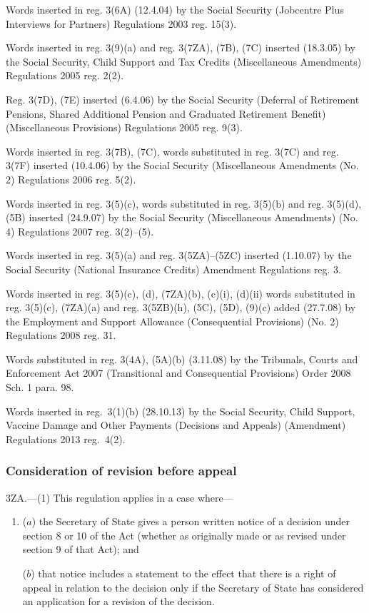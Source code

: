 \documentclass[12pt,a4paper]{article}
\begin{document}
{Words inserted in reg. 3(6A) (12.4.04) by the Social Security (Jobcentre Plus Interviews for Partners) Regulations 2003 reg. 15(3).

Words inserted in reg. 3(9)(a) and reg. 3(7ZA), (7B), (7C) inserted (18.3.05) by the Social Security, Child Support and Tax Credits (Miscellaneous Amendments) Regulations 2005 reg. 2(2).

Reg. 3(7D), (7E) inserted (6.4.06) by the Social Security (Deferral of Retirement Pensions, Shared Additional Pension and Graduated Retirement Benefit) (Miscellaneous Provisions) Regulations 2005 reg. 9(3).

Words inserted in reg. 3(7B), (7C), words substituted in reg. 3(7C) and reg. 3(7F) inserted (10.4.06) by the Social Security (Miscellaneous Amendments (No. 2) Regulations 2006 reg. 5(2).

Words inserted in reg. 3(5)(c), words substituted in reg. 3(5)(b) and reg. 3(5)(d), (5B) inserted (24.9.07) by the Social Security (Miscellaneous Amendments) (No. 4) Regulations 2007 reg. 3(2)--(5).

Words inserted in reg. 3(5)(a) and reg. 3(5ZA)--(5ZC) inserted (1.10.07) by the Social Security (National Insurance Credits) Amendment Regulations reg. 3.

Words inserted in reg. 3(5)(c), (d), (7ZA)(b), (c)(i), (d)(ii) words substituted in reg. 3(5)(c), (7ZA)(a) and reg. 3(5ZB)(h), (5C), (5D), (9)(c) added (27.7.08) by the Employment and Support Allowance (Consequential Provisions) (No. 2) Regulations 2008 reg. 31.

Words substituted in reg. 3(4A), (5A)(b) (3.11.08) by the Tribunals, Courts and Enforcement Act 2007 (Transitional and Consequential Provisions) Order 2008 Sch. 1 para. 98.

Words inserted in reg.~3(1)(b) (28.10.13) by the Social Security, Child Support, Vaccine Damage and Other Payments (Decisions and Appeals) (Amendment) Regulations 2013 reg.~4(2).
}

\subsubsection[3ZA. Consideration of revision before appeal]{Consideration of revision before appeal}

3ZA.---(1)  This regulation applies in a case where—
\begin{enumerate}\item[]
($a$) the Secretary of State gives a person written notice of a decision under section 8 or 10 of the Act (whether as originally made or as revised under section 9 of that Act); and

($b$) that notice includes a statement to the effect that there is a right of appeal in relation to the decision only if the Secretary of State has considered an application for a revision of the decision.
\end{enumerate}
\end{document}
